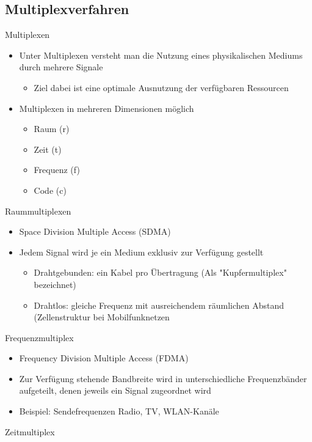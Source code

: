   \subsection{Multiplexverfahren}
    Multiplexen
    \begin{itemize}
      \item Unter Multiplexen versteht man die Nutzung eines physikalischen Mediums durch mehrere
        Signale
        \begin{itemize}
          \item Ziel dabei ist eine optimale Ausnutzung der verfügbaren Ressourcen
        \end{itemize}
      \item Multiplexen in mehreren Dimensionen möglich
        \begin{itemize}
          \item Raum (r)
          \item Zeit (t)
          \item Frequenz (f)
          \item Code (c)
        \end{itemize}
    \end{itemize}
    Raummultiplexen
    \begin{itemize}
      \item Space Division Multiple Access (SDMA)
      \item Jedem Signal wird je ein Medium exklusiv zur Verfügung gestellt
        \begin{itemize}
          \item Drahtgebunden: ein Kabel pro Übertragung (Als "Kupfermultiplex" bezeichnet)
          \item Drahtlos: gleiche Frequenz mit ausreichendem räumlichen Abstand (Zellenstruktur bei
            Mobilfunknetzen
        \end{itemize}
    \end{itemize}
    Frequenzmultiplex
    \begin{itemize}
      \item Frequency Division Multiple Access (FDMA)
      \item Zur Verfügung stehende Bandbreite wird in unterschiedliche Frequenzbänder aufgeteilt,
        denen jeweils ein Signal zugeordnet wird
      \item Beispiel: Sendefrequenzen Radio, TV, WLAN-Kanäle
    \end{itemize}
    Zeitmultiplex
